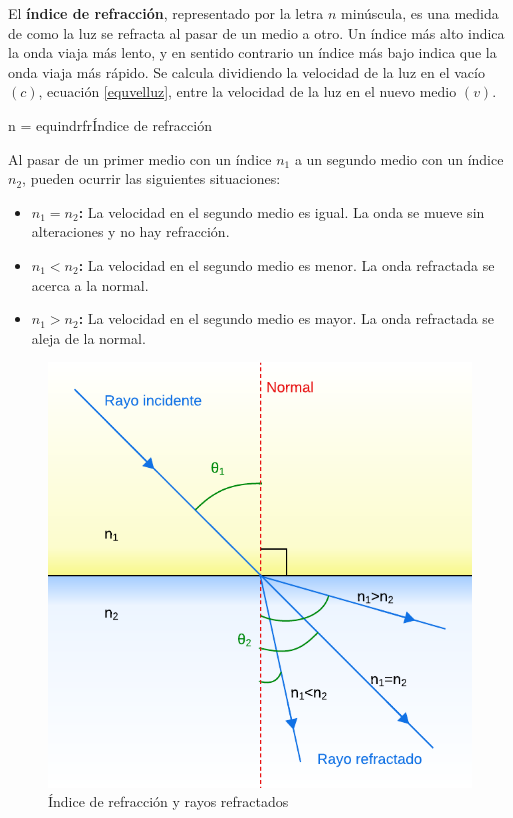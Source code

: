 El \textbf{índice de refracción}, representado por la letra $n$ minúscula, es una medida de como la luz se refracta al pasar de un medio a otro. Un índice más alto indica la onda viaja más lento, y en sentido contrario un índice más bajo indica que la onda viaja más rápido. Se calcula dividiendo la velocidad de la luz en el vacío $(c)$, ecuación \ref{equvelluz}, entre la velocidad de la luz en el nuevo medio $(v)$.

\begin{listequbox}
  {n = }{equindrfr}{Índice de refracción}
\end{listequbox}

Al pasar de un primer medio con un índice $n_1$ a un segundo medio con un índice $n_2$, pueden ocurrir las siguientes situaciones:

\begin{itemize}
  \item \textbf{$n_1 = n_2$:} La velocidad en el segundo medio es igual. La onda se mueve sin alteraciones y no hay refracción.
  \item \textbf{$n_1 < n_2$:} La velocidad en el segundo medio es menor. La onda refractada se acerca a la normal.
  \item \textbf{$n_1 > n_2$:} La velocidad en el segundo medio es mayor. La onda refractada se aleja de la normal.
\end{itemize}

\begin{figure}[H]
  \centering
  \includegraphics{imagenes/rayos_refractados.png}
  \caption{Índice de refracción y rayos refractados}
\end{figure}
